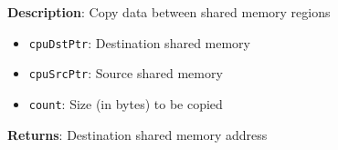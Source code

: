 \textbf{Description}: Copy data between shared memory regions
\begin{itemize}
  \item \texttt{cpuDstPtr}: Destination shared memory
  \item \texttt{cpuSrcPtr}: Source shared memory
  \item \texttt{count}: Size (in bytes) to be copied
\end{itemize}
\textbf{Returns}: Destination shared memory address

%
%
%
%
%
%
%

